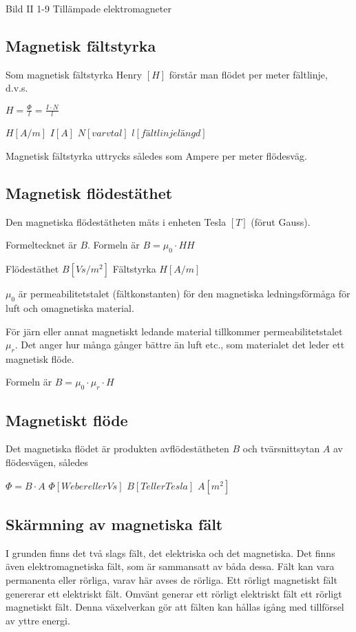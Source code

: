 \documentclass[a4paper,twoside,twocolumn,openright]{book}
\begin{document}
Bild II 1-9 Tillämpade elektromagneter

\subsection{Magnetisk fältstyrka}

Som magnetisk fältstyrka Henry $[H]$ förstår man flödet per meter fältlinje, d.v.s.

$H=\frac{\Phi}{l} = \frac{I \cdot N}{l}$

$H [A/m]$ $I [A]$ $N [varvtal]$ $l [fältlinjelängd]$

Magnetisk fältstyrka uttrycks således som Ampere per meter flödesväg.

\subsection{Magnetisk flödestäthet}

Den magnetiska flödestätheten mäts i enheten Tesla $[T]$ (förut Gauss).

Formeltecknet är $B$.
Formeln är $B = \mu_0 \cdot HH$

Flödestäthet $B [Vs/m^2]$ Fältstyrka $H [A/m]$

$\mu_0$ är permeabilitetstalet (fältkonstanten) för den magnetiska ledningsförmåga för
luft och omagnetiska material.

För järn eller annat magnetiskt ledande material tillkommer permeabilitetstalet $\mu_r$.
Det anger hur många gånger bättre än luft etc., som materialet det leder ett magnetisk
flöde.

Formeln är $B = \mu_0 \cdot \mu_r \cdot H$

\subsection{Magnetiskt flöde}

Det magnetiska flödet är produkten avflödestätheten $B$ och tvärsnittsytan $A$ av flödesvägen, således

$\Phi = B \cdot A$
$\Phi [Weber eller Vs]$ $B [T eller Tesla]$ $A [m^2]$

\subsection{Skärmning av magnetiska fält}

I grunden finns det två slags fält, det elektriska och det magnetiska. Det finns även
elektromagnetiska fält, som är sammansatt av båda dessa. Fält kan vara permanenta eller
rörliga, varav här avses de rörliga. Ett rörligt magnetiskt fält genererar ett elektriskt
fält.
Omvänt generar ett rörligt elektriskt fält ett rörligt magnetiskt fält. Denna växelverkan
gör att fälten kan hållas igång med tillförsel av yttre energi.
\end{document}
